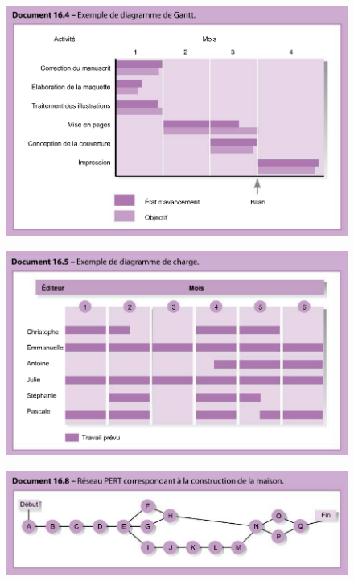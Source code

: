 \documentclass[letterpaper, 12pt]{article}
\begin{document}
		\begin{figure}[H]
			\centering
			\includegraphics[scale=0.75]{Images/gantt}
		\end{figure}\noindent
		\begin{figure}[H]
			\centering
			\includegraphics[scale=0.75]{Images/charge}
		\end{figure}\noindent
		\begin{figure}[H]
			\centering
			\includegraphics[scale=0.75]{Images/pert}
		\end{figure}\noindent
\end{document}

